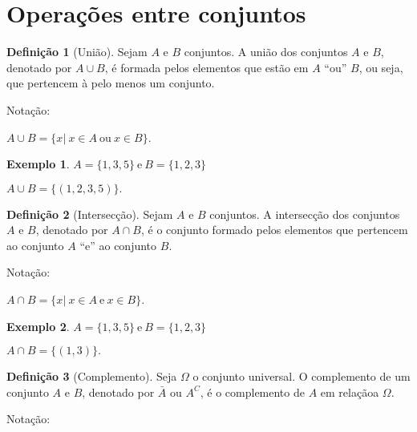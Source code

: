 \documentclass[]{book}
\theoremstyle{definition}
\newtheorem{definition}{Definição}[chapter]
\theoremstyle{definition}
\newtheorem{example}{Exemplo}[chapter]
\theoremstyle{definition}
\theoremstyle{remark}
\begin{document}
\hypertarget{operauxe7uxf5es-entre-conjuntos}{%
\section{Operações entre conjuntos}\label{operauxe7uxf5es-entre-conjuntos}}

\begin{definition}[União]
\protect\hypertarget{def:defunion}{}{\label{def:defunion} \iffalse (União) \fi{} }Sejam \(A\) e \(B\) conjuntos. A união dos conjuntos \(A\) e \(B\), denotado por \(A \cup B\), é formada pelos elementos que estão em \(A\) ``ou'' \(B\), ou seja, que pertencem à pelo menos um conjunto.
\end{definition}

Notação:

\(A \cup B = \{ x |\ x \in A \ \mbox{ou} \ x \in B\}\).
\begin{example}
\protect\hypertarget{exm:unnamed-chunk-14}{}{\label{exm:unnamed-chunk-14} }
\(A = \{1,3,5\} \ \text{e} \ B = \{1,2,3\}\)

\(A \cup B = \{(1,2,3,5)\}.\)
\end{example}

\begin{definition}[Intersecção]
\protect\hypertarget{def:defintersec}{}{\label{def:defintersec} \iffalse (Intersecção) \fi{} }Sejam \(A\) e \(B\) conjuntos. A intersecção dos conjuntos \(A\) e \(B\), denotado por \(A \cap B\), é o conjunto formado pelos elementos que pertencem ao conjunto \(A\) ``e'' ao conjunto \(B\).
\end{definition}

Notação:

\(A \cap B = \{ x |\ x \in A \ \mbox{e} \ x \in B\}\).

\begin{example}
\protect\hypertarget{exm:unnamed-chunk-15}{}{\label{exm:unnamed-chunk-15} }
\(A = \{1,3,5\} \ \text{e} \ B = \{1,2,3\}\)

\(A \cap B = \{(1,3)\}.\)
\end{example}

\begin{definition}[Complemento]
\protect\hypertarget{def:defcompl}{}{\label{def:defcompl} \iffalse (Complemento) \fi{} }Seja \(\Omega\) o conjunto universal. O complemento de um conjunto \(A\) e \(B\), denotado por \(\bar{A}\) ou \(A^C\), é o complemento de \(A\) em relaçãoa \(\Omega\).
\end{definition}

Notação:
\end{document}

